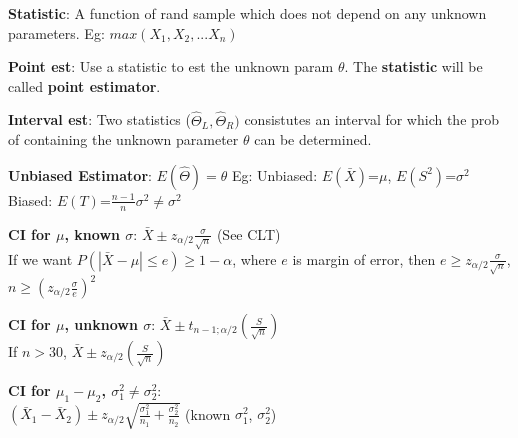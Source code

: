 \documentclass[a4paper,landscape]{article}
\newcommand{\rnname}[1]{\textbf{#1}}
\begin{document}
\begin{multicols*}{4}
\begin{flatitemize}
\item \rnname{Statistic}: A function of rand sample which does not depend on any unknown parameters. Eg: $max(X_1, X_2, ... X_n)$
\item \rnname{Point est}: Use a statistic to est the unknown param $\theta$. The \textbf{statistic} will be called \textbf{point estimator}.
\item \rnname{Interval est}: Two statistics ($\hat \Theta_L, \hat \Theta_R)$ consistutes an interval for which the prob of containing the unknown parameter $\theta$ can be determined.
\item \rnname{Unbiased Estimator}: $E(\hat \Theta) = \theta$ Eg: Unbiased: $E(\bar X)$=$\mu$, $E(S^2)$=$\sigma^2$ Biased: $E(T)$=$\frac{n-1}{n}\sigma^2 \neq \sigma^2$
\item \rnname{CI for $\mu$, known $\sigma$}: $\bar X \pm z_{\alpha/2}\frac{\sigma}{\sqrt{n}}$ (See CLT)
\\ If we want $P(|\bar X - \mu| \leq e) \geq 1 - \alpha$, where $e$ is margin of error, then $e \geq z_{\alpha/2}\frac{\sigma}{\sqrt{n}}$, $n \geq (z_{\alpha/2}\frac{\sigma}{e})^2$
\item \rnname{CI for $\mu$, unknown $\sigma$}: $\bar X \pm t_{n-1;\alpha/2} (\frac{S}{\sqrt{n}})$ \\
If $n > 30$, $\bar X \pm z_{\alpha/2} (\frac{S}{\sqrt{n}})$

\item \rnname{CI for $\mu_1 - \mu_2$, $\sigma_1^2 \neq \sigma_2^2$}: \\ 
$(\bar X_1 - \bar X_2) \pm z_{\alpha/2}\sqrt{\frac{\sigma_1^2}{n_1}+\frac{\sigma_2^2}{n_2}}$ (known $\sigma_1^2$, $\sigma_2^2$)


\end{flatitemize}
\end{multicols*}
\end{document}
